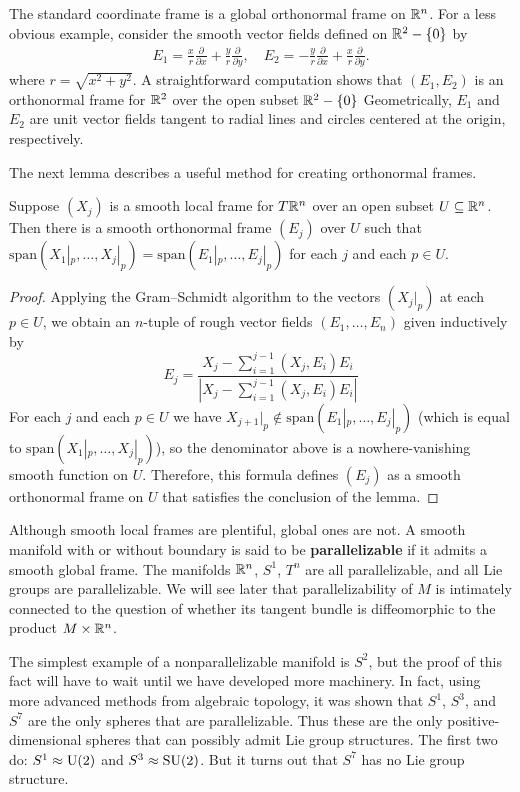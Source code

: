 \begin{example}\label{polar frame R^2}
The standard coordinate frame is a global orthonormal frame on $\mathbb{R}^n$. For a less obvious example, consider the smooth vector fields defined on $\mathbb{R}^2-\{0\}$ by
\begin{align}\label{polar frame R^2-1}
E_1=\frac{x}{r}\frac{\partial}{\partial x}+\frac{y}{r}\frac{\partial}{\partial y},\quad E_2=-\frac{y}{r}\frac{\partial}{\partial x}+\frac{x}{r}\frac{\partial}{\partial y}.
\end{align}
where $r=\sqrt{x^2+y^2}$. A straightforward computation shows that $(E_1,E_2)$ is an orthonormal frame for $\mathbb{R}^2$ over the open subset $\mathbb{R}^2-\{0\}$ Geometrically, $E_1$ and $E_2$ are unit vector fields tangent to radial lines and circles centered at the origin, respectively.
\end{example}
The next lemma describes a useful method for creating orthonormal frames.
\begin{lemma}\label{Gram-Schmidt frame}
Suppose $(X_j)$ is a smooth local frame for $T\mathbb{R}^n$ over an open subset $U\subseteq\mathbb{R}^n$. Then there is a smooth orthonormal frame $(E_j)$ over $U$ such that $\mathrm{span}(X_1|_p,\dots,X_j|_p)=\mathrm{span}(E_1|_p,\dots,E_j|_p)$ for each $j$ and each $p\in U$.
\end{lemma}
\begin{proof}
Applying the Gram–Schmidt algorithm to the vectors $(X_j|_p)$ at each $p\in U$, we obtain an $n$-tuple of rough vector fields $(E_1,\dots,E_n)$ given inductively by
\[E_j=\frac{X_j-\sum_{i=1}^{j-1}(X_j,E_i)E_i}{|X_j-\sum_{i=1}^{j-1}(X_j,E_i)E_i|}\]
For each $j$ and each $p\in U$ we have $X_{j+1}|_p\notin\mathrm{span}(E_1|_p,\dots,E_j|_p)$ (which is
equal to $\mathrm{span}(X_1|_p,\dots,X_j|_p)$), so the denominator above is a nowhere-vanishing smooth function on $U$. Therefore, this formula defines $(E_j)$ as a smooth orthonormal frame on $U$ that satisfies the conclusion of the lemma.
\end{proof}
Although smooth local frames are plentiful, global ones are not. A smooth manifold with or without boundary is said to be \textbf{parallelizable} if it admits a smooth global frame. The manifolds $\mathbb{R}^n$, $S^1$, $T^n$ are all parallelizable, and all Lie groups are parallelizable. We will see later that parallelizability of $M$ is intimately connected to the question of whether its tangent bundle is diffeomorphic to the product $M\times\mathbb{R}^n$.\par
The simplest example of a nonparallelizable manifold is $S^2$, but the proof of this fact will have to wait until we have developed more machinery. In fact, using more advanced methods from algebraic topology, it was shown that $S^1$, $S^3$, and $S^7$ are the only spheres that are parallelizable. Thus these are the only positive-dimensional spheres that can possibly admit Lie group structures. The first two do: $S^1\approx\mathrm{U}(2)$ and $S^3\approx\mathrm{SU}(2)$. But it turns out that $S^7$ has no Lie group structure. 
